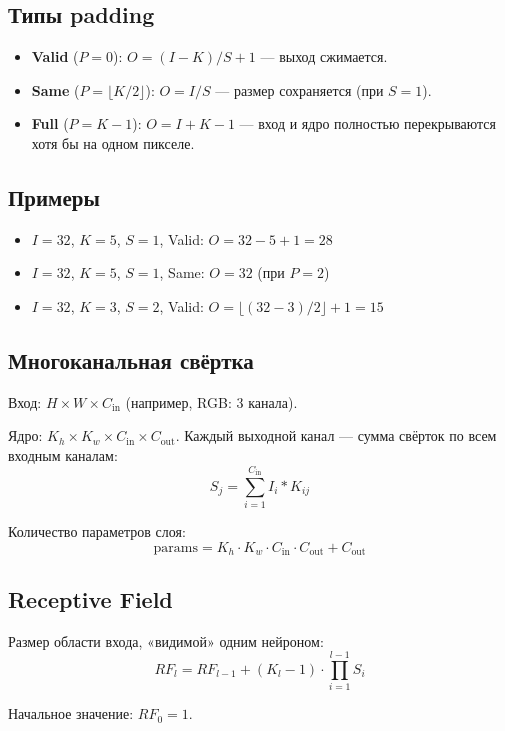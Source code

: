 \documentclass[a4paper,12pt]{article}
\begin{document}
\subsection{Типы padding}

\begin{itemize}
    \item \textbf{Valid} ($P=0$): $O = (I - K) / S + 1$ — выход сжимается.
    \item \textbf{Same} ($P = \lfloor K/2 \rfloor$): $O = I / S$ — размер сохраняется (при $S=1$).
    \item \textbf{Full} ($P = K - 1$): $O = I + K - 1$ — вход и ядро полностью перекрываются хотя бы на одном пикселе.
\end{itemize}

\subsection{Примеры}

\begin{itemize}
    \item $I=32$, $K=5$, $S=1$, Valid: $O = 32 - 5 + 1 = 28$
    \item $I=32$, $K=5$, $S=1$, Same: $O = 32$ (при $P=2$)
    \item $I=32$, $K=3$, $S=2$, Valid: $O = \lfloor (32 - 3) / 2 \rfloor + 1 = 15$
\end{itemize}

\subsection{Многоканальная свёртка}

Вход: $H \times W \times C_{\text{in}}$ (например, RGB: 3 канала).

Ядро: $K_h \times K_w \times C_{\text{in}} \times C_{\text{out}}$. Каждый выходной канал — сумма свёрток по всем входным каналам:
\[
S_j = \sum_{i=1}^{C_{\text{in}}} I_i * K_{ij}
\]

Количество параметров слоя:
\[
\text{params} = K_h \cdot K_w \cdot C_{\text{in}} \cdot C_{\text{out}} + C_{\text{out}}
\]

\subsection{Receptive Field}

Размер области входа, «видимой» одним нейроном:
\[
RF_l = RF_{l-1} + (K_l - 1) \cdot \prod_{i=1}^{l-1} S_i
\]

Начальное значение: $RF_0 = 1$.
\end{document}
